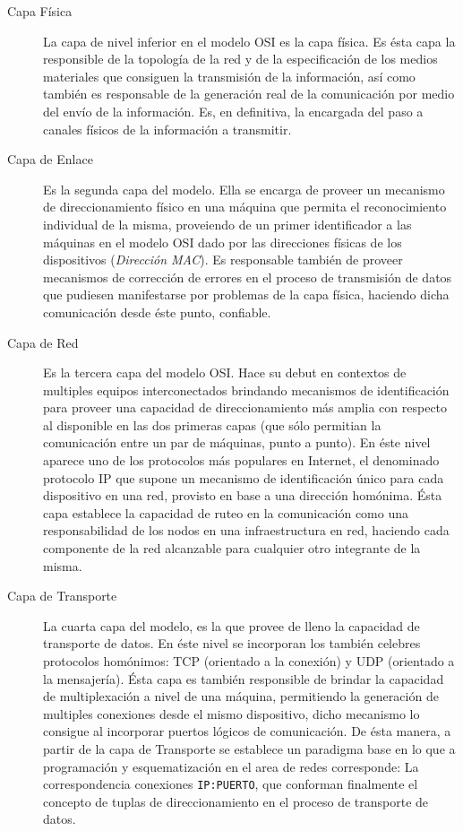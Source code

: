 \begin{description}
\item[Capa Física] La capa de nivel inferior en el modelo OSI es la capa física. Es ésta capa la responsible de la topología de la red y de la especificación de los medios materiales que consiguen la transmisión de la información, así como también es responsable de la generación real de la comunicación por medio del envío de la información. Es, en definitiva, la encargada del paso a canales físicos de la información a transmitir.

\item[Capa de Enlace] Es la segunda capa del modelo. Ella se encarga de proveer un mecanismo de direccionamiento físico en una máquina que permita el reconocimiento individual de la misma, proveiendo de un primer identificador a las máquinas en el modelo OSI dado por las direcciones físicas de los dispositivos (\emph{Dirección MAC}). Es responsable también de proveer mecanismos de corrección de errores en el proceso de transmisión de datos que pudiesen manifestarse por problemas de la capa física, haciendo dicha comunicación desde éste punto, confiable.

\item[Capa de Red] Es la tercera capa del modelo OSI. Hace su debut en contextos de multiples equipos interconectados brindando mecanismos de identificación para proveer una capacidad de direccionamiento más amplia con respecto al disponible en las dos primeras capas (que sólo permitian la comunicación entre un par de máquinas, punto a punto). En éste nivel aparece uno de los protocolos más populares en Internet, el denominado protocolo IP que supone un mecanismo de identificación único para cada dispositivo en una red, provisto en base a una dirección homónima. Ésta capa establece la capacidad de ruteo en la comunicación como una responsabilidad de los nodos en una infraestructura en red, haciendo cada componente de la red alcanzable para cualquier otro integrante de la misma.

\item[Capa de Transporte] La cuarta capa del modelo, es la que provee de lleno la capacidad de transporte de datos. En éste nivel se incorporan los también celebres protocolos homónimos: TCP (orientado a la conexión) y UDP (orientado a la mensajería). Ésta capa es también responsible de brindar la capacidad de multiplexación a nivel de una máquina, permitiendo la generación de multiples conexiones desde el mismo dispositivo, dicho mecanismo lo consigue al incorporar puertos lógicos de comunicación. De ésta manera, a partir de la capa de Transporte se establece un paradigma base en lo que a programación y esquematización en el area de redes corresponde: La correspondencia conexiones \verb=IP:PUERTO=, que conforman finalmente el concepto de tuplas de direccionamiento en el proceso de transporte de datos.


\end{description}
